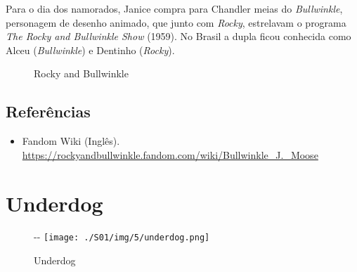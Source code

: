 Para o dia dos namorados, Janice compra para Chandler meias do
\emph{Bullwinkle}, personagem de desenho animado, que junto com
\emph{Rocky}, estrelavam o programa \emph{The Rocky and Bullwinkle Show}
(1959). No Brasil a dupla ficou conhecida como Alceu (\emph{Bullwinkle})
e Dentinho (\emph{Rocky}).

\begin{figure}
  \centering
    \caption{Rocky and Bullwinkle\label{fig:rocky-and-bullwinkle}}
\end{figure}

\hypertarget{referuxeancias}{%
\subsection{Referências}\label{referuxeancias}}

\begin{itemize}
\tightlist
\item
  \sloppy Fandom Wiki (Inglês). \url{https://rockyandbullwinkle.fandom.com/wiki/Bullwinkle_J._Moose}
\end{itemize}

\hypertarget{underdog}{%
\section{Underdog}\label{underdog}}

\begin{figure}[!ht]
  \begin{adjustwidth}{-\oddsidemargin-1in}{-\rightmargin}
    \centering
    \texttt{[image: ./S01/img/5/underdog.png]}
    \caption{Underdog\label{fig:underdog}}
  \end{adjustwidth}
\end{figure}

